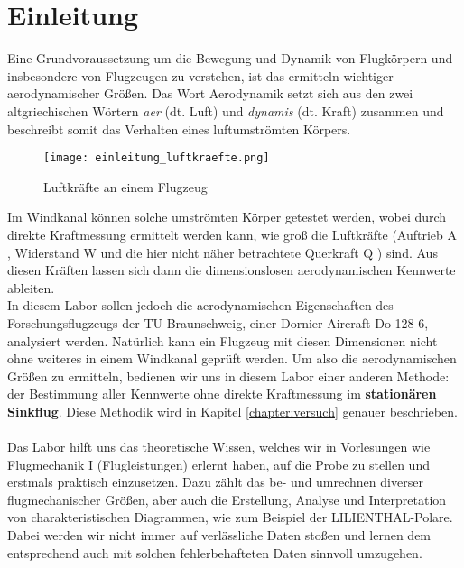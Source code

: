 \chapter{Einleitung}
\label{chapter:einleitung}

Eine Grundvoraussetzung um die Bewegung und Dynamik von Flugkörpern und insbesondere von Flugzeugen zu verstehen, ist das ermitteln wichtiger aerodynamischer Größen. Das Wort Aerodynamik setzt sich aus den zwei altgriechischen Wörtern \textit{aer} (dt. Luft) und \textit{dynamis} (dt. Kraft) zusammen und beschreibt somit das Verhalten eines luftumströmten Körpers.

\begin{figure}[h] 
	\centering
	\texttt{[image: einleitung\_luftkraefte.png]}
	\caption{Luftkräfte an einem Flugzeug \cite{labor-skript}}
	\label{figure:luftkraefte}
\end{figure}

\noindent Im Windkanal können solche umströmten Körper getestet werden, wobei durch direkte Kraftmessung ermittelt werden kann, wie groß die Luftkräfte (Auftrieb A , Widerstand W  und die hier nicht näher betrachtete Querkraft Q ) sind. Aus diesen Kräften lassen sich dann die dimensionslosen aerodynamischen Kennwerte ableiten.\\
In diesem Labor sollen jedoch die aerodynamischen Eigenschaften des Forschungsflugzeugs der TU Braunschweig, einer Dornier Aircraft Do 128-6, analysiert werden. Natürlich kann ein Flugzeug mit diesen Dimensionen nicht ohne weiteres in einem Windkanal geprüft werden. Um also die aerodynamischen Größen zu ermitteln, bedienen wir uns in diesem Labor einer anderen Methode: der Bestimmung aller Kennwerte ohne direkte Kraftmessung im \textbf{stationären Sinkflug}. Diese Methodik wird in Kapitel \ref{chapter:versuch} genauer beschrieben.\\\\
Das Labor hilft uns das theoretische Wissen, welches wir in Vorlesungen wie Flugmechanik I (Flugleistungen) erlernt haben, auf die Probe zu stellen und erstmals praktisch einzusetzen. Dazu zählt das be- und umrechnen diverser flugmechanischer Größen, aber auch die Erstellung, Analyse und Interpretation von charakteristischen Diagrammen, wie zum Beispiel der LILIENTHAL-Polare. Dabei werden wir nicht immer auf verlässliche Daten stoßen und lernen dem entsprechend auch mit solchen fehlerbehafteten Daten sinnvoll umzugehen.

